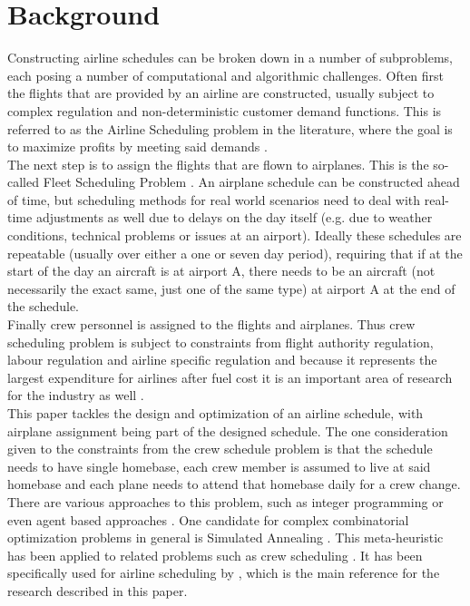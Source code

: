 \documentclass[journal]{IEEEtran}
\begin{document}
\section{Background}
Constructing airline schedules can be broken down in a number of subproblems, each posing a number of computational and algorithmic challenges. Often first the flights that are provided by an airline are constructed, usually subject to complex regulation and non-deterministic customer demand functions. This is referred to as the Airline Scheduling problem in the literature, where the goal is to maximize profits by meeting said demands \cite{Etschmaier1985}. \\
The next step is to assign the flights that are flown to airplanes. This is the so-called Fleet Scheduling Problem \cite{Rushmeier1997}. An airplane schedule can be constructed ahead of time, but scheduling methods for real world scenarios need to deal with real-time adjustments as well due to delays on the day itself (e.g. due to weather conditions, technical problems or issues at an airport). Ideally these schedules are repeatable (usually over either a one or seven day period), requiring that if at the start of the day an aircraft is at airport A, there needs to be an aircraft (not necessarily the exact same, just one of the same type) at airport A at the end of the schedule. \\
Finally crew personnel is assigned to the flights and airplanes. Thus crew scheduling problem is subject to constraints from flight authority regulation, labour regulation and airline specific regulation and because it represents the largest expenditure for airlines after fuel cost it is an important area of research for the industry as well \cite{Gopalakrishnan2005}.\\
This paper tackles the design and optimization of an airline schedule, with airplane assignment being part of the designed schedule. The one consideration given to the constraints from the crew schedule problem is that the schedule needs to have single homebase, each crew member is assumed to live at said homebase and each plane needs to attend that homebase daily for a crew change.\\
There are various approaches to this problem, such as integer programming\cite{Raff1983} or even agent based approaches \cite{Langerman1997}. One candidate for complex combinatorial optimization problems in general is Simulated Annealing \cite{kirkpatrick1983optimization}. This meta-heuristic has been applied to related problems such as crew scheduling \cite{Sosnowska2001}. It has been specifically used for airline scheduling by \cite{Mashford2001}, which is the main reference for the research described in this paper.
\end{document}
